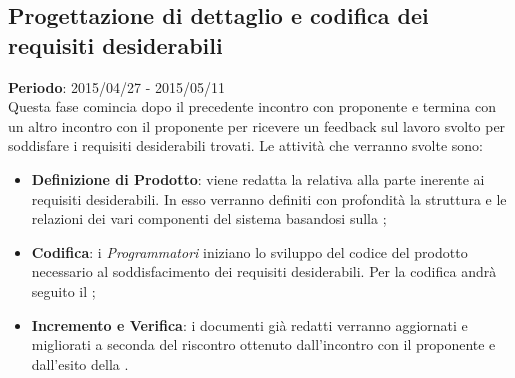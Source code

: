 	\subsection{Progettazione di dettaglio e codifica dei requisiti desiderabili} %
	\label{sub:progettazione_di_dettaglio_e_codifica_dei_requisiti_desiderabili}
	\textbf{Periodo}:  2015/04/27 - 2015/05/11 \\
	Questa fase comincia dopo il precedente incontro con proponente e termina con un altro incontro con il proponente per ricevere un feedback sul lavoro svolto per soddisfare i requisiti desiderabili trovati.
	Le attività che verranno svolte sono:
		\begin{itemize}
			\item \textbf{Definizione di Prodotto}: viene redatta la \docNameVersionDdP{} relativa alla parte inerente ai requisiti desiderabili. In esso verranno definiti con profondità la struttura e le relazioni dei vari componenti del sistema basandosi sulla \docNameVersionST;
			\item \textbf{Codifica}: i \emph{Programmatori} iniziano lo sviluppo del codice del prodotto necessario al soddisfacimento dei requisiti desiderabili. Per la codifica andrà seguito il \docNameVersionDdP;
			\item \textbf{Incremento e Verifica}: i documenti già redatti verranno aggiornati e migliorati a seconda del riscontro ottenuto dall'incontro con il proponente e dall'esito della \RPmin.
		\end{itemize}
		
